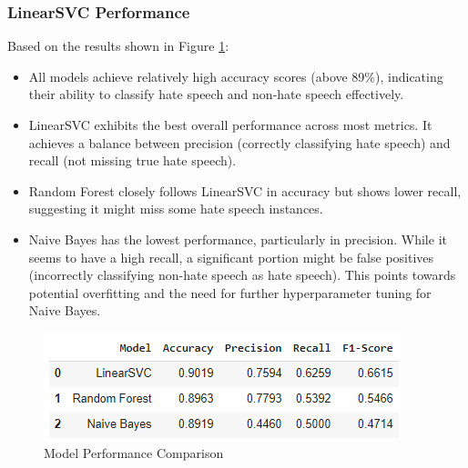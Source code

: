 \documentclass{article}
\begin{document}
\subsubsection{LinearSVC Performance}
Based on the results shown in Figure \ref{fig:model_performance}:
\begin{itemize}
    \item All models achieve relatively high accuracy scores (above 89\%), indicating their ability to classify hate speech and non-hate speech effectively.
    \item LinearSVC exhibits the best overall performance across most metrics. It achieves a balance between precision (correctly classifying hate speech) and recall (not missing true hate speech).
    \item Random Forest closely follows LinearSVC in accuracy but shows lower recall, suggesting it might miss some hate speech instances.
    \item Naive Bayes has the lowest performance, particularly in precision. While it seems to have a high recall, a significant portion might be false positives (incorrectly classifying non-hate speech as hate speech). This points towards potential overfitting and the need for further hyperparameter tuning for Naive Bayes.
\end{itemize}
\begin{figure}[H]
    \centering
    \includegraphics[width=\linewidth]{figure4.png}
    \caption{Model Performance Comparison}
    \label{fig:model_performance}
\end{figure}
\end{document}
